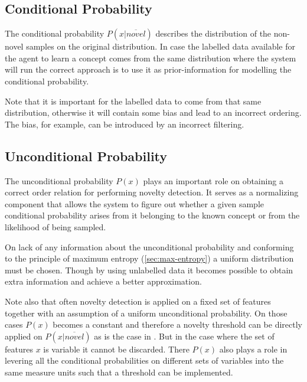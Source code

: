 \subsection{Conditional Probability}
The conditional probability $P(x|\overline{novel})$ describes the distribution
of the non-novel samples on the original distribution. In case the labelled data
available for the agent to learn a concept comes from the same distribution
where the system will run the correct approach is to use it as prior-information
for modelling the conditional probability.

Note that it is important for the labelled data to come from that same
distribution, otherwise it will contain some bias and lead to an incorrect
ordering. The bias, for example, can be introduced by an incorrect filtering.

\subsection{Unconditional Probability}
The unconditional probability $P(x)$ plays an important role on obtaining a
correct order relation for performing novelty detection.
It serves as a normalizing component that allows the system to figure out
whether a given sample conditional probability arises from it belonging to
the known concept or from the likelihood of being sampled.


On lack of any information about the unconditional probability and conforming to
the principle of maximum entropy (\autoref{sec:max-entropy}) a uniform
distribution must be chosen.
Though by using unlabelled data it becomes possible to obtain extra information
and achieve a better approximation.


Note also that often novelty detection is applied on a fixed set of features
together with an assumption of a uniform unconditional probability.
On those cases $P(x)$ becomes a constant and therefore a novelty threshold
can be directly applied on $P(x|\overline{novel})$ as is the case in \cite{bishop1994novelty}.
But in the case where the set of features $x$ is variable it cannot be
discarded. There $P(x)$ also plays a role in levering all the conditional
probabilities on different sets of variables into the same measure units
such that a threshold can be implemented.



